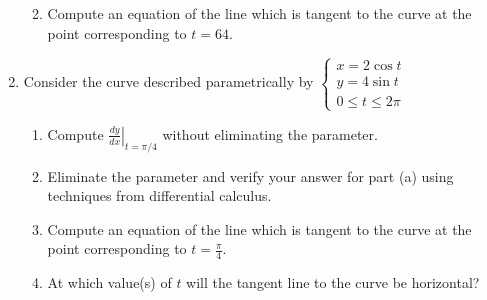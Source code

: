 \documentclass[12pt]{article}
\newif\ifans
\begin{document}
\begin{enumerate}
\begin{enumerate}
\ifans{\fbox{\parbox{1\linewidth}{The curve is equivalent to $y=x^{2/3}+1$, $x \geq 0$.  And, $t=64$ corresponds to $x=8$.  Thus, $\left.\frac{dy}{dx}\right|_{t=64}=\left.\frac{dy}{dx}\right|_{x=8}=\frac{1}{3}$}}} \fi

\item Compute an equation of the line which is tangent to the curve at the point corresponding to $t=64$.

\ifans{\fbox{$y-5=\frac{1}{3}(x-8)$}} \fi

\end{enumerate}

\newpage

\item Consider the curve described parametrically by $\left\{\begin{array}{l}
x=2\cos{t}\\
y=4\sin{t}\\
0 \leq t \leq 2\pi \end{array}\right.$

\begin{enumerate}

\item Compute $\left.\frac{dy}{dx}\right|_{t=\pi/4}$ without eliminating the parameter.

\ifans{\fbox{$\left.\frac{dy}{dx}\right|_{t=\pi/4}=-2$}} \fi

\item Eliminate the parameter and verify your answer for part (a) using techniques from differential calculus.

\ifans{\fbox{\parbox{1\linewidth}{The curve is equivalent to the ellipse $\frac{x^2}{4}+\frac{y^2}{16}=1$.  And, $t=\frac{\pi}{4}$ corresponds to the point $(x,y)=(\sqrt{2},2\sqrt{2})$.  Thus, you can use implicit differentiation and $\left.\frac{dy}{dx}\right|_{t=\pi/4}=\left.\frac{dy}{dx}\right|_{(x,y)=\left(\sqrt{2},2\sqrt{2}\right)}=-2$}}} \fi

\item Compute an equation of the line which is tangent to the curve at the point corresponding to $t=\frac{\pi}{4}$.

\ifans{\fbox{$y-2\sqrt{2}=-2\left(x-\sqrt{2}\right)$}} \fi

\item At which value(s) of $t$ will the tangent line to the curve be horizontal?

\ifans{\fbox{$t=\frac{\pi}{2}$ and $t=\frac{3\pi}{2}$}} \fi

\end{enumerate}

\end{enumerate}
\end{document}
